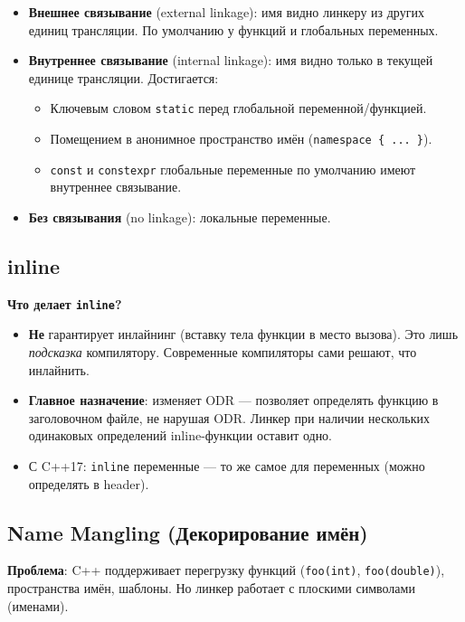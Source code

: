 \documentclass[12pt,a4paper]{article}
\begin{document}
\begin{itemize}
    \item \textbf{Внешнее связывание} (external linkage): имя видно линкеру из других единиц трансляции. По умолчанию у функций и глобальных переменных.
    \item \textbf{Внутреннее связывание} (internal linkage): имя видно только в текущей единице трансляции. Достигается:
    \begin{itemize}
        \item Ключевым словом \texttt{static} перед глобальной переменной/функцией.
        \item Помещением в анонимное пространство имён (\texttt{namespace \{ ... \}}).
        \item \texttt{const} и \texttt{constexpr} глобальные переменные по умолчанию имеют внутреннее связывание.
    \end{itemize}
    \item \textbf{Без связывания} (no linkage): локальные переменные.
\end{itemize}

\subsection{inline}

\textbf{Что делает \texttt{inline}?}
\begin{itemize}
    \item \textbf{Не} гарантирует инлайнинг (вставку тела функции в место вызова). Это лишь \textit{подсказка} компилятору. Современные компиляторы сами решают, что инлайнить.
    \item \textbf{Главное назначение}: изменяет ODR --- позволяет определять функцию в заголовочном файле, не нарушая ODR. Линкер при наличии нескольких одинаковых определений inline-функции оставит одно.
    \item С C++17: \texttt{inline} переменные --- то же самое для переменных (можно определять в header).
\end{itemize}

\subsection{Name Mangling (Декорирование имён)}

\textbf{Проблема}: C++ поддерживает перегрузку функций (\texttt{foo(int)}, \texttt{foo(double)}), пространства имён, шаблоны. Но линкер работает с плоскими символами (именами).
\end{document}
